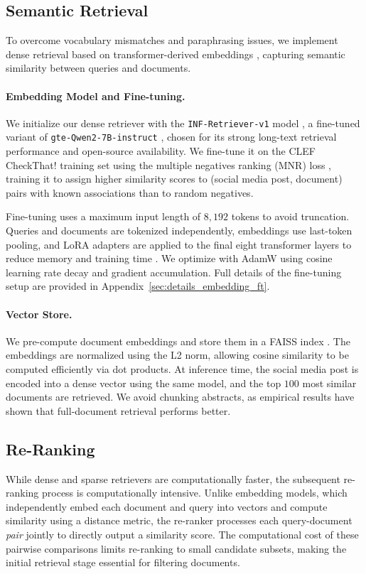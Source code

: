 \subsection{Semantic Retrieval} \label{sec:semantic}
To overcome vocabulary mismatches and paraphrasing issues, we implement dense retrieval based on transformer-derived embeddings \cite{vaswani_attention_2017}, capturing semantic similarity between queries and documents.

\paragraph{Embedding Model and Fine-tuning.}
We initialize our dense retriever with the \texttt{INF-Retriever-v1} model \cite{infly-ai_inf-retriever-v1_nodate}, a fine-tuned variant of \texttt{gte-Qwen2-7B-instruct} \cite{yang_qwen2_2024}, chosen for its strong long-text retrieval performance and open-source availability. 
We fine-tune it on the CLEF CheckThat! training set using the multiple negatives ranking (MNR) loss \cite{henderson_efficient_2017}, training it to assign higher similarity scores to (social media post, document) pairs with known associations than to random negatives.

Fine-tuning uses a maximum input length of $8,192$ tokens to avoid truncation. Queries and documents are tokenized independently, embeddings use last-token pooling, and LoRA adapters \cite{hu_lora_2022} are applied to the final eight transformer layers to reduce memory and training time \cite{tuggener_so_2024}. We optimize with AdamW \cite{loshchilov_decoupled_2019} using cosine learning rate decay and gradient accumulation. Full details of the fine-tuning setup are provided in Appendix~\ref{sec:details_embedding_ft}.


\paragraph{Vector Store.}
We pre-compute document embeddings and store them in a FAISS index \cite{johnson_billion-scale_2021, douze_faiss_2024}. The embeddings are normalized using the L2 norm, allowing cosine similarity to be computed efficiently via dot products. At inference time, the social media post is encoded into a dense vector using the same model, and the top $100$ most similar documents are retrieved. We avoid chunking abstracts, as empirical results have shown that full-document retrieval performs better.


\subsection{Re-Ranking} \label{sec:reranker}
While dense and sparse retrievers are computationally faster, the subsequent re-ranking process is computationally intensive. Unlike embedding models, which independently embed each document and query into vectors and compute similarity using a distance metric, the re-ranker processes each query-document \emph{pair} jointly to directly output a similarity score. The computational cost of these pairwise comparisons limits re-ranking to small candidate subsets, making the initial retrieval stage essential for filtering documents.

